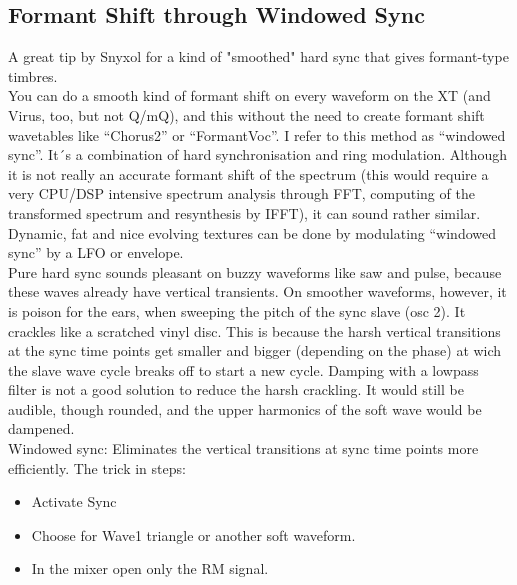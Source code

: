 \subsection{Formant Shift through Windowed Sync}
A great tip by Snyxol for a kind of "smoothed" hard sync that gives formant-type timbres.\\
You can do a smooth kind of formant shift on every waveform on the XT (and Virus, too, but not Q/mQ), and this without the need to create formant shift wavetables like “Chorus2” or “FormantVoc”. I refer to this method as “windowed sync”. It´s a combination of hard synchronisation and ring modulation. Although it is not really an accurate formant shift of the spectrum (this would require a very CPU/DSP intensive spectrum analysis through FFT, computing of the transformed spectrum and resynthesis by IFFT), it can sound rather similar. Dynamic, fat and nice evolving textures can be done by modulating “windowed sync” by a LFO or envelope.\\
Pure hard sync sounds pleasant on buzzy waveforms like saw and pulse, because these waves already have vertical transients. On smoother waveforms, however, it is poison for the ears, when sweeping the pitch of the sync slave (osc 2). It crackles like a scratched vinyl disc. This is because the harsh vertical transitions at the sync time points get smaller and bigger (depending on the phase) at wich the slave wave cycle breaks off to start a new cycle. Damping with a lowpass filter is not a good solution to reduce the harsh crackling. It would still be audible, though rounded, and the upper harmonics of the soft wave would be dampened.\\
Windowed sync: Eliminates the vertical transitions at sync time points more efficiently. The trick in steps:
\begin{itemize}
	\item Activate Sync
	\item Choose for Wave1 triangle or another soft waveform.
	\item In the mixer open only the RM signal.
\end{itemize}
\bigskip %
%

